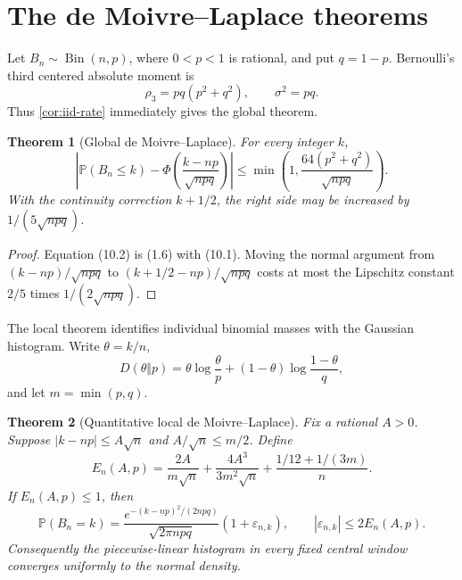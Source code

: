 \documentclass[11pt]{article}
\newtheorem{theorem}{Theorem}[section]
\newcommand{\Pp}{\mathbb P}
\newcommand{\PhiN}{\Phi}
\begin{document}
\section{The de Moivre--Laplace theorems}
\label{sec:demoivre}

Let \(B_n\sim\operatorname{Bin}(n,p)\), where
\(0<p<1\) is rational, and put \(q=1-p\).  Bernoulli's third centered
absolute moment is
\[
 \rho_3=pq(p^2+q^2),
 \qquad \sigma^2=pq.                                  \tag{10.1}
\]
Thus \cref{cor:iid-rate} immediately gives the global theorem.

\begin{theorem}[Global de Moivre--Laplace]
For every integer \(k\),
\[
 \left|
 \Pp(B_n\le k)-
 \PhiN\!\left(\frac{k-np}{\sqrt{npq}}\right)
 \right|
 \le\min\!\left(1,
       \frac{64(p^2+q^2)}{\sqrt{npq}}\right).         \tag{10.2}
\]
With the continuity correction \(k+1/2\), the right side may be increased by
\(1/(5\sqrt{npq})\).
\end{theorem}

\begin{proof}
Equation (10.2) is (1.6) with (10.1).  Moving the normal argument from
\((k-np)/\sqrt{npq}\) to \((k+1/2-np)/\sqrt{npq}\) costs at most the
Lipschitz constant \(2/5\) times \(1/(2\sqrt{npq})\).
\end{proof}

The local theorem identifies individual binomial masses with the Gaussian
histogram.  Write \(\theta=k/n\),
\[
 D(\theta\Vert p)=
 \theta\log\frac{\theta}{p}+(1-\theta)\log\frac{1-\theta}{q},             \tag{10.3}
\]
and let \(m=\min(p,q)\).

\begin{theorem}[Quantitative local de Moivre--Laplace]
\label{thm:local-demoivre}
Fix a rational \(A>0\).  Suppose
\(|k-np|\le A\sqrt n\) and \(A/\sqrt n\le m/2\).  Define
\[
 E_n(A,p)=
 \frac{2A}{m\sqrt n}+
 \frac{4A^3}{3m^2\sqrt n}+
 \frac{1/12+1/(3m)}{n}.                               \tag{10.4}
\]
If \(E_n(A,p)\le1\), then
\[
 \Pp(B_n=k)
 =\frac{e^{-(k-np)^2/(2npq)}}{\sqrt{2\pi npq}}
   (1+\varepsilon_{n,k}),
 \qquad |\varepsilon_{n,k}|\le2E_n(A,p).             \tag{10.5}
\]
Consequently the piecewise-linear histogram in every fixed central window
converges uniformly to the normal density.
\end{theorem}
\end{document}
